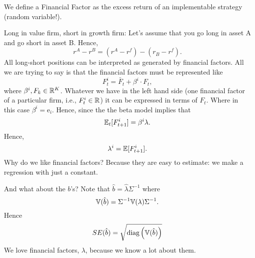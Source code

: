 We define a Financial Factor as the excess return of an implementable strategy (random variable!).

\note Long in value firm, short in growth firm: Let's assume that you go long in asset A and go short in asset B. Hence, 
$$
		r^A - r^B  = (r^A - r^f) - (r_B-r^f).	
$$
All long-short positions can be interpreted as generated by financial factors. All we are trying to say is that the financial factors must be represented like
$$
	F_t^i = \bar{F}_t + \beta^i \cdot F_t,
$$
where $\beta^i, F_k\in\mathbb{R}^K$. Whatever we have in the left hand side (one financial factor of a particular firm, i.e., $F_t^i\in\mathbb{R}$) it can be expressed in terms of $F_t$. Where in this case $\beta^i = \text{e}_i$. Hence, since the the beta model implies that
$$
	\mathbb{E}_t[F_{t+1}^i] = \beta^i  \lambda .
$$
Hence, 
$$
		\lambda^i = \mathbb{E}[F_{t+1}^i].
$$
Why do we like financial factors? Because they are easy to estimate: we make a regression with just a constant.

And what about the $b$'s? Note that $\hat{b} = \hat{\lambda}\Sigma^{-1}$ where
$$
	\mathbb{V}(\hat{b}) = \Sigma^{-1}\mathbb{V}(\lambda)\Sigma^{-1}.
$$
Hence
$$
SE(\hat{b}) = \sqrt{\text{diag}\left(\mathbb{V}(\hat{b})\right)}
$$
We love financial factors, $\lambda$, because we know a lot about them.
